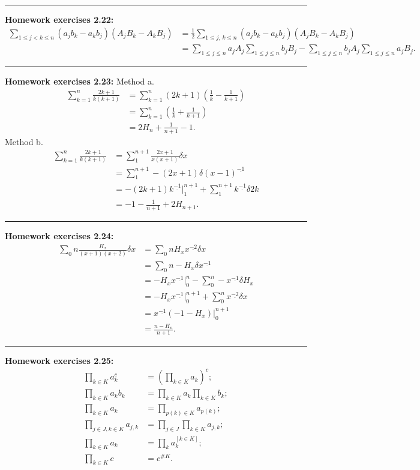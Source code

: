 \documentclass{article}
\begin{document}
\noindent\rule{\textwidth}{0.4pt}
\textbf{Homework exercises 2.22:}
\begin{align}
\sum_{1 \le j < k \le n} (a_j b_k - a_k b_j)(A_j B_k - A_k B_j) &= \frac{1}{2} \sum_{1 \le j\text{, } k \le n} (a_j b_k - a_k b_j)(A_j B_k - A_k B_j) \\
								&= \sum_{1 \le j \le n} a_j A_j \sum_{1 \le j \le n} b_j B_j - \sum_{1 \le j \le n} b_j A_j \sum_{1 \le j \le n} a_j B_j.
\end{align}

\noindent\rule{\textwidth}{0.4pt}
\textbf{Homework exercises 2.23:}
Method a.
\begin{align}
\sum_{k=1}^n \frac{2k+1}{k(k+1)} &= \sum_{k=1}^n (2k+1)(\frac{1}{k} - \frac{1}{k+1}) \\
				 &= \sum_{k=1}^n (\frac{1}{k} + \frac{1}{k+1}) \\
				 &= 2H_n + \frac{1}{n+1} - 1.
\end{align}
Method b.
\begin{align}
\sum_{k=1}^n \frac{2k+1}{k(k+1)} &= \sum\nolimits_{1}^{n+1} \frac{2x+1}{x(x+1)} \delta x \\
				 &= \sum\nolimits_{1}^{n+1} -(2x+1) \delta (x-1)^{\underline {-1}} \\
				 &= -(2k+1)k^{\underline {-1}}\Big|_1^{n+1} + \sum\nolimits_{1}^{n+1} k^{\underline {-1}} \delta 2k\\
				 &= -1 - \frac{1}{n+1} + 2H_{n+1}.
\end{align}

\noindent\rule{\textwidth}{0.4pt}
\textbf{Homework exercises 2.24:}
\begin{align}
\sum\nolimits_{0}{n} \frac{H_x}{(x+1)(x+2)} \delta x &= \sum\nolimits_{0}{n} H_x x^{\underline {-2}} \delta x \\
						       &= \sum\nolimits_{0}{n} -H_x \delta x^{\underline {-1}} \\
						       &= -H_x x^{\underline {-1}}\Big|_0^{n} - \sum\nolimits_{0}^{n} -x^{\underline {-1}} \delta H_x \\
						       &= -H_x x^{\underline {-1}}\Big|_0^{n+1} + \sum\nolimits_{0}^{n} x^{\underline {-2}} \delta x\\
						       &= x^{\underline {-1}} (-1 - H_x) \Big|_0^{n+1}\\
						       &= \frac{n - H_n}{n+1}.
\end{align}
\noindent\rule{\textwidth}{0.4pt}
\textbf{Homework exercises 2.25:}
\begin{align}
\prod_{k \in K}a_k^c &= (\prod_{k \in K}a_k)^c; \\
\prod_{k \in K}a_k b_k &= \prod_{k \in K}a_k \prod_{k \in K}b_k; \\
\prod_{k \in K}a_k &= \prod_{p(k) \in K}a_{p(k)}; \\
\prod_{j \in J,k\in K} a_{j,k} &= \prod_{j \in J} \prod_{k \in K} a_{j,k}; \\
\prod_{k \in K}a_k &= \prod_k a_k^{[k \in K]};\\
\prod_{k \in K} c &= c^{\#K}.
\end{align}
\end{document}
